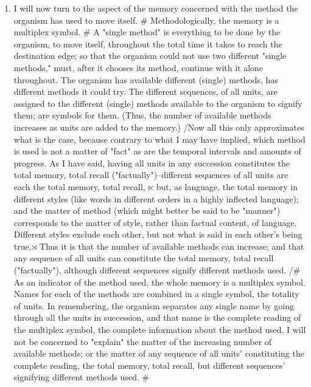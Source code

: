 \begin{enumerate}
\item I will now turn to the aspect of the memory concerned with the 
method the organism has used to move itself. \# Methodologically, the 
memory is a multiplex symbol. \# A "single method" is everything to be done 
by the organism, to move itself, throughout the total time it takes to reach 
the destination edge; so that the organism could not use two different 
"single methods," must, after it chooses its method, continue with it alone 
throughout. The organism has available different (single) methods, has 
different methods it could try. The different sequences, of all units, are 
assigned to the different (single) methods available to the organism to signify 
them; are symbols for them. (Thus, the number of available methods 
increases as units are added to the memory.) \slash Now all this only approximates 
what is the case, because contrary to what I may have implied, which 
method is used is not a matter of "fact" as are the temporal intervals and 
amounts of progress. As I have said, having all units in any succession 
constitutes the total memory, total recall ("factually")--different sequences 
of all units are each the total memory, total recall, $\ltimes$ but, as language, the 
total memory in different styles (like words in different orders in a highly 
inflected language); and the matter of method (which might better be said to 
be "manner") corresponds to the matter of style, rather than factual 
content, of language. Different styles exclude each other, but not what is 
said in each other's being true.$\rtimes$ Thus it is that the number of available 
methods can increase; and that any sequence of all units can constitute the 
total memory, total recall ("factually"), although different sequences signify 
different methods used. \slash \# As an indicator of the method used, the whole 
memory is a multiplex symbol. Names for each of the methods are combined 
in a single symbol, the totality of units. In remembering, the organism 
separates any single name by going through all the units in succession, and 
that name is the complete reading of the multiplex symbol, the complete 
information about the method used. I will not be concerned to "explain" 
the matter of the increasing number of available methods; or the matter of 
any sequence of all units' constituting the complete reading, the total 
memory, total recall, but different sequences' signifying different methods 
used. \#


\end{enumerate}
